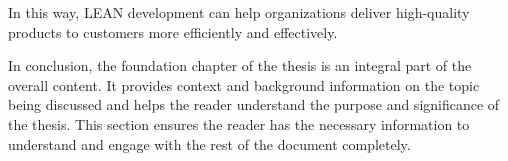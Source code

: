 In this way, LEAN development can help organizations deliver high-quality products to customers more efficiently and effectively.

In conclusion, the foundation chapter of the thesis is an integral part of the overall content. 
It provides context and background information on the topic being discussed and helps the reader understand the purpose and significance of the thesis. 
This section ensures the reader has the necessary information to understand and engage with the rest of the document completely.
\clearpage





